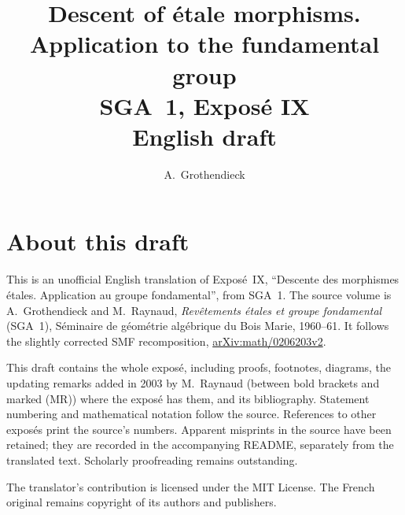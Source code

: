 \documentclass[11pt,a4paper,oneside]{amsbook}
\title[SGA~1, Expos\'e IX (English draft)]{Descent of \'etale morphisms. Application to the fundamental group\\
{\normalsize SGA~1, Expos\'e IX\\English draft}}
\author{A.\ Grothendieck}
\date{}
\begin{document}
\frontmatter
\maketitle

\chapter*{About this draft}
This is an unofficial English translation of Expos\'e~IX,
``Descente des morphismes \'etales. Application au groupe fondamental'', from SGA~1. The source volume is
A.\ Grothendieck and M.\ Raynaud,
\textit{Rev\^etements \'etales et groupe fondamental} (SGA~1),
S\'eminaire de g\'eom\'etrie alg\'ebrique du Bois Marie, 1960--61.
It follows the slightly corrected SMF recomposition,
\href{https://arxiv.org/abs/math/0206203v2}{arXiv:math/0206203v2}.

This draft contains the whole expos\'e, including proofs, footnotes,
diagrams, the updating remarks added in 2003 by M.~Raynaud (between bold
brackets and marked (MR)) where the expos\'e has them, and its bibliography.
Statement numbering and mathematical notation follow the source.
References to other expos\'es print the source's numbers. Apparent
misprints in the source have been retained; they are recorded in the
accompanying README, separately from the translated text. Scholarly
proofreading remains outstanding.

The translator's contribution is licensed under
the MIT License.
The French original remains copyright of its authors and publishers.

\tableofcontents
\mainmatter
\setcounter{chapter}{8}




\end{document}
